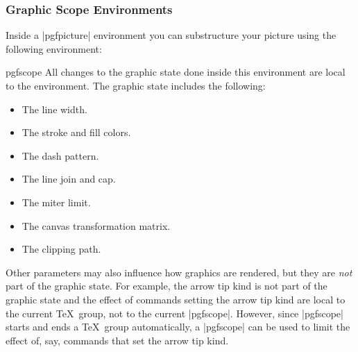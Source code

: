 \subsubsection{Graphic Scope Environments}

Inside a |{pgfpicture}| environment you can substructure your picture
using the following environment:

\begin{environment}{{pgfscope}}
  All changes to the graphic state done inside this environment are
  local to the environment. The graphic state includes the following:
  \begin{itemize}
  \item
    The line width.
  \item
    The stroke and fill colors.
  \item
    The dash pattern.
  \item
    The line join and cap.
  \item
    The miter limit.
  \item
    The canvas transformation matrix.
  \item
    The clipping path.
  \end{itemize}
  Other parameters may also influence how graphics are rendered, but they
  are \emph{not} part of the graphic state. For example, the arrow tip
  kind is not part of the graphic state and the effect of commands
  setting the arrow tip kind are local to the current \TeX\ group, not
  to the current |{pgfscope}|. However, since |{pgfscope}| starts and
  ends a \TeX\ group automatically, a |{pgfscope}| can be used to
  limit the effect of, say, commands that set the arrow tip kind.

\begin{codeexample}[]
\begin{pgfpicture}
  \begin{pgfscope}
    {
      \pgfsetlinewidth{2pt}
      \pgfpathrectangle{\pgfpointorigin}{\pgfpoint{2ex}{2ex}}
    }
    \pgfpathrectangle{\pgfpoint{3ex}{0ex}}{\pgfpoint{2ex}{2ex}}
  \end{pgfscope}
  \pgfpathrectangle{\pgfpoint{6ex}{0ex}}{\pgfpoint{2ex}{2ex}}
\end{pgfpicture}
\end{codeexample}
  
\begin{codeexample}[]
\begin{pgfpicture}
  \begin{pgfscope}
    {
      \pgfpathmoveto{\pgfpointorigin}\pgfpathlineto{\pgfpoint{2ex}{2ex}}
    }
    \pgfpathmoveto{\pgfpoint{3ex}{0ex}}\pgfpathlineto{\pgfpoint{5ex}{2ex}}
  \end{pgfscope}
  \pgfpathmoveto{\pgfpoint{6ex}{0ex}}\pgfpathlineto{\pgfpoint{8ex}{2ex}}
\end{pgfpicture}
\end{codeexample}


\end{environment}
